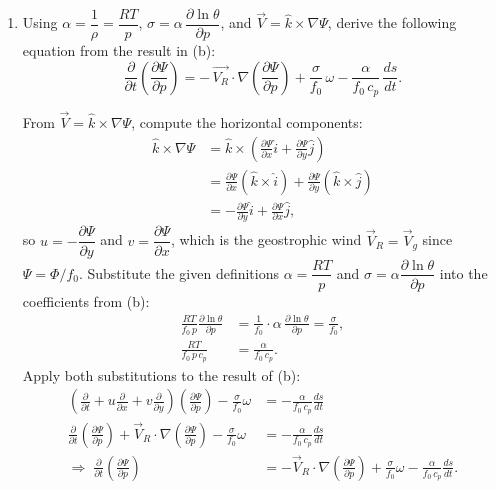 \documentclass[11pt,a4paper]{article}
\begin{document}
{\begin{enumerate}[label=(\alph*)]
    \item Using $\alpha = \dfrac{1}{\rho} = \dfrac{RT}{p}$, $\sigma = \alpha\,\dfrac{\partial\ln\theta}{\partial p}$, and $\vec{V} = \hat{k}\times\nabla\Psi$, derive the following equation from the result in (b):
    \[
        \frac{\partial}{\partial t} \left(\frac{\partial\Psi}{\partial p}\right) = -\,\vec{V_R}\cdot\nabla \left(\frac{\partial\Psi}{\partial p}\right) + \frac{\sigma}{f_0}\,\omega - \frac{\alpha}{f_0\, c_p}\,\frac{ds}{dt}.
    \]
\begin{solution}
    From $\vec{V} = \hat{k}\times\nabla\Psi$, compute the horizontal components:
    \begin{align*}
        \hat{k}\times\nabla\Psi 
        &= \hat{k}\times \left(\frac{\partial\Psi}{\partial x}\hat{i} + \frac{\partial\Psi}{\partial y}\hat{j}\right) \\
        &= \frac{\partial\Psi}{\partial x}(\hat{k}\times\hat{i}) + \frac{\partial\Psi}{\partial y}(\hat{k}\times\hat{j}) \\
        &= -\frac{\partial\Psi}{\partial y}\hat{i} + \frac{\partial\Psi}{\partial x}\hat{j},
    \end{align*}
    so $u = -\dfrac{\partial\Psi}{\partial y}$ and $v = \dfrac{\partial\Psi}{\partial x}$, which is the geostrophic wind $\vec{V}_R = \vec{V}_g$ since $\Psi = \Phi/f_0$. Substitute the given definitions $\alpha = \dfrac{RT}{p}$ and $\sigma = \alpha\dfrac{\partial\ln\theta}{\partial p}$ into the coefficients from (b):
    \begin{align*}
        \frac{RT}{f_0\,p}\frac{\partial\ln\theta}{\partial p} 
        &= \frac{1}{f_0}\cdot\alpha\,\frac{\partial\ln\theta}{\partial p} = \frac{\sigma}{f_0},\\
        \frac{RT}{f_0\,p\,c_p}
        &= \frac{\alpha}{f_0\,c_p}.
    \end{align*}
    Apply both substitutions to the result of (b):
    \begin{align*}
        \left(\frac{\partial}{\partial t} + u\frac{\partial}{\partial x} + v\frac{\partial}{\partial y}\right)  \left(\frac{\partial\Psi}{\partial p}\right) - \frac{\sigma}{f_0}\omega 
        &= -\frac{\alpha}{f_0\,c_p}\frac{ds}{dt}\\
        \frac{\partial}{\partial t}  \left(\frac{\partial\Psi}{\partial p}\right) + \vec{V}_R\cdot\nabla  \left(\frac{\partial\Psi}{\partial p}\right) - \frac{\sigma}{f_0}\omega 
        &= -\frac{\alpha}{f_0\,c_p}\frac{ds}{dt}\\
        \Rightarrow\;\frac{\partial}{\partial t}  \left(\frac{\partial\Psi}{\partial p}\right) 
        &= -\vec{V}_R\cdot\nabla  \left(\frac{\partial\Psi}{\partial p}\right) + \frac{\sigma}{f_0}\omega - \frac{\alpha}{f_0\,c_p}\frac{ds}{dt}.
    \end{align*}
\end{solution}


\end{enumerate}}
\end{document}
